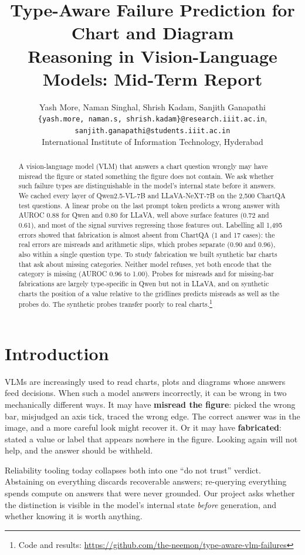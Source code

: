 \documentclass[11pt]{article}
\title{Type-Aware Failure Prediction for Chart and Diagram\\Reasoning in Vision-Language Models: Mid-Term Report}
\author{Yash More, Naman Singhal, Shrish Kadam, Sanjith Ganapathi \\
  \texttt{\{yash.more, naman.s, shrish.kadam\}@research.iiit.ac.in}, \\
  \texttt{sanjith.ganapathi@students.iiit.ac.in} \\
  International Institute of Information Technology, Hyderabad}
\begin{document}
\maketitle

\begin{abstract}
A vision-language model (VLM) that answers a chart question wrongly may have
misread the figure or stated something the figure does not contain. We ask
whether such failure types are distinguishable in the model's internal state
before it answers. We cached every layer of Qwen2.5-VL-7B and LLaVA-NeXT-7B on the
2,500 ChartQA test questions. A linear probe on the last
prompt token predicts a wrong answer with AUROC 0.88 for Qwen and 0.80 for
LLaVA, well above surface features (0.72 and 0.61), and most of the signal
survives regressing those features out. Labelling all 1,495 errors
showed that fabrication is almost absent from ChartQA (1 and 17 cases): the real
errors are misreads and arithmetic slips, which probes separate (0.90 and 0.96),
also within a single question type. To study fabrication we built synthetic bar
charts that ask about missing categories. Neither model refuses, yet both encode
that the category is missing (AUROC 0.96 to 1.00).
Probes for misreads and for missing-bar fabrications are largely type-specific in
Qwen but not in LLaVA, and on synthetic charts the position of a value relative
to the gridlines predicts misreads as well as the probes do. The synthetic probes
transfer poorly to real charts.\footnote{Code and results:
\url{https://github.com/the-neemon/type-aware-vlm-failures}}
\end{abstract}

\section{Introduction}

VLMs are increasingly used to read charts, plots and diagrams whose answers feed
decisions. When such a model answers incorrectly, it can be wrong in two
mechanically different ways. It may have \textbf{misread the figure}: picked the
wrong bar, misjudged an axis tick, traced the wrong edge. The correct answer was
in the image, and a more careful look might recover it. Or it may have
\textbf{fabricated}: stated a value or label that appears nowhere in the figure.
Looking again will not help, and the answer should be withheld.

Reliability tooling today collapses both into one ``do not trust'' verdict.
Abstaining on everything discards recoverable answers; re-querying everything
spends compute on answers that were never grounded. Our project asks whether
the distinction is visible in the model's internal state \emph{before}
generation, and whether knowing it is worth anything.
\end{document}
